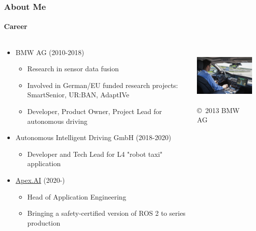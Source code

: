 \begin{frame}
\frametitle{About Me}
\framesubtitle{Career}
\begin{columns}[T]
    \begin{column}{.65\textwidth}
    \begin{itemize}
        \item BMW AG (2010-2018)
        \begin{itemize}
            \item Research in sensor data fusion
            \item Involved in German/EU funded research projects:
                SmartSenior, UR:BAN, AdaptIVe
            \item Developer, Product Owner, Project Lead for autonomous driving
        \end{itemize}
        \item Autonomous Intelligent Driving GmbH (2018-2020)
        \begin{itemize}
            \item Developer and Tech Lead for L4 "robot taxi" application
        \end{itemize}
        \item \href{https://www.apex.ai/}{Apex.AI} (2020-)
        \begin{itemize}
            \item Head of Application Engineering
            \item Bringing a safety-certified version of ROS 2 to series
                production
        \end{itemize}
    \end{itemize}
    \end{column}
    \begin{column}{.35\textwidth}
    \centering
    \includegraphics[height=3.0cm]{images/michael-aeberhard-bmw.jpg} \\
    \tiny \copyright \, 2013 BMW AG
    \end{column}
\end{columns}
\end{frame}